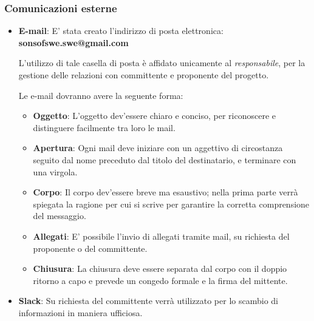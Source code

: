 \subsubsection{Comunicazioni esterne}
\begin{itemize}
\item\textbf{E-mail}: E' stata creato l'indirizzo di posta elettronica:
\textbf{sonsofswe.swe@gmail.com}

L'utilizzo di tale casella di posta è affidato unicamente al \textit{responsabile}, per la gestione delle relazioni con committente e proponente del progetto.

Le e-mail dovranno avere la seguente forma:
\begin{itemize}
\item\textbf{Oggetto}: L'oggetto dev'essere chiaro e conciso, per riconoscere e distinguere facilmente tra loro le mail.
\item\textbf{Apertura}: Ogni mail deve iniziare con un aggettivo di circostanza seguito dal nome preceduto dal titolo del destinatario, e terminare con una virgola.
\item\textbf{Corpo}: Il corpo dev'essere breve ma esaustivo; nella prima parte verrà spiegata la ragione per cui si scrive per garantire la corretta comprensione del messaggio. 
\item\textbf{Allegati}: E' possibile l'invio di allegati tramite mail, su richiesta del proponente o del committente.
\item\textbf{Chiusura}: La chiusura deve essere separata dal corpo con il doppio ritorno a capo e prevede un congedo formale e la firma del mittente.
\end{itemize}

\item\textbf{Slack}: Su richiesta del committente verrà utilizzato per lo scambio di informazioni in maniera ufficiosa.
\end{itemize}


